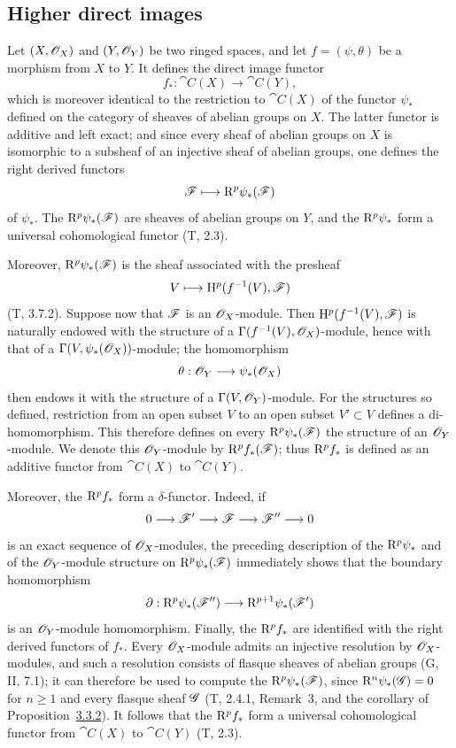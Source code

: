 \subsection{Higher direct images}
\label{subsection:0.12.2}

\begin{env}[12.2.1]
\label{0.12.2.1}
Let $(X,\mathscr{O}_X)$ and $(Y,\mathscr{O}_Y)$ be two ringed spaces, and let
$f=(\psi,\theta)$ be a morphism from $X$ to $Y$.  It defines the direct
image functor
\[
  f_*:\cat{C}(X)\longrightarrow\cat{C}(Y),
\]
which is moreover identical to the restriction to $\cat{C}(X)$ of the
functor $\psi_*$ defined on the category of sheaves of abelian groups
on $X$.
The latter functor is additive and left exact; and since every sheaf of
abelian groups on $X$ is isomorphic to a subsheaf of an injective sheaf
of abelian groups, one defines the right derived functors
\[
  \mathscr{F}\longmapsto\mathrm{R}^p\psi_*(\mathscr{F})
\]
of $\psi_*$.  The $\mathrm{R}^p\psi_*(\mathscr{F})$ are sheaves of abelian groups
on $Y$, and the $\mathrm{R}^p\psi_*$ form a universal cohomological functor
(T, 2.3).

Moreover, $\mathrm{R}^p\psi_*(\mathscr{F})$ is the sheaf associated with the
presheaf
\[
  V\longmapsto\mathrm{H}^p(f^{-1}(V),\mathscr{F})
\]
(T, 3.7.2).
Suppose now that $\mathscr{F}$ is an $\mathscr{O}_X$-module.
Then $\mathrm{H}^p(f^{-1}(V),\mathscr{F})$ is naturally endowed with the structure
of a $\Gamma(f^{-1}(V),\mathscr{O}_X)$-module, hence with that of a
$\Gamma(V,\psi_*(\mathscr{O}_X))$-module; the homomorphism
\[
  \theta:\mathscr{O}_Y\longrightarrow\psi_*(\mathscr{O}_X)
\]
then endows it with the structure of a
$\Gamma(V,\mathscr{O}_Y)$-module.
For the structures so defined, restriction from an open subset $V$ to
an open subset $V'\subset V$ defines a di-homomorphism.  This therefore
defines on every $\mathrm{R}^p\psi_*(\mathscr{F})$ the structure of an
$\mathscr{O}_Y$-module.  We denote this $\mathscr{O}_Y$-module by
$\mathrm{R}^p f_*(\mathscr{F})$; thus $\mathrm{R}^p f_*$ is defined as an additive
functor from $\cat{C}(X)$ to $\cat{C}(Y)$.

Moreover, the $\mathrm{R}^p f_*$ form a $\delta$-functor.  Indeed, if
\[
  0\longrightarrow\mathscr{F}'\longrightarrow\mathscr{F}
  \longrightarrow\mathscr{F}''\longrightarrow0
\]
is an exact sequence of $\mathscr{O}_X$-modules, the preceding description
of the $\mathrm{R}^p\psi_*$ and of the $\mathscr{O}_Y$-module structure on
$\mathrm{R}^p\psi_*(\mathscr{F})$ immediately shows that the boundary homomorphism
\[
  \partial:\mathrm{R}^p\psi_*(\mathscr{F}'')
  \longrightarrow\mathrm{R}^{p+1}\psi_*(\mathscr{F}')
\]
is an $\mathscr{O}_Y$-module homomorphism.
Finally, the $\mathrm{R}^p f_*$ are identified with the right derived functors
of $f_*$.  Every $\mathscr{O}_X$-module admits an injective resolution by
$\mathscr{O}_X$-modules, and such a resolution consists of flasque sheaves
of abelian groups (G, II, 7.1); it can therefore be used to compute the
$\mathrm{R}^p\psi_*(\mathscr{F})$, since $\mathrm{R}^n\psi_*(\mathscr{G})=0$ for $n\geq1$
and every flasque sheaf $\mathscr{G}$ (T, 2.4.1, Remark~3, and the
corollary of Proposition~\hyperref[0.3.3.2]{3.3.2}).
It follows that the $\mathrm{R}^p f_*$ form a universal cohomological functor
from $\cat{C}(X)$ to $\cat{C}(Y)$ (T, 2.3).
\end{env}

